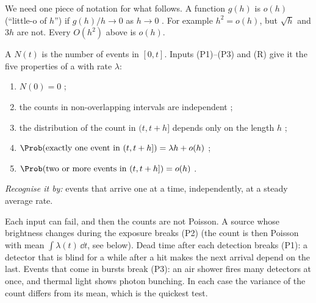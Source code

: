 We need one piece of notation for what follows. A function $g(h)$ is $o(h)$
(``little-o of $h$'') if $g(h)/h\to0$ as $h\to0$ . For example $h^2=o(h)$, but $\sqrt h$ and $3h$ are not. Every $O(h^2)$
above is $o(h)$.

\begin{workdef}
A  $N(t)$ is the number of events in $[0,t]$. Inputs
(P1)--(P3) and (R) give it the five properties of a  with rate $\lambda$:
\begin{enumerate}[label=(\roman*),leftmargin=2em,itemsep=1pt]
  \item $N(0)=0$ ;
  \item the counts in non-overlapping intervals are independent ;
  \item the distribution of the count in $(t,t+h]$ depends only on the length $h$ ;
  \item $\Prob(\text{exactly one event in }(t,t+h])=\lambda h+o(h)$ ;
  \item $\Prob(\text{two or more events in }(t,t+h])=o(h)$ .
\end{enumerate}
\emph{Recognise it by:} events that arrive one at a time, independently, at a steady average rate.
\end{workdef}

\begin{pitfall}
Each input can fail, and then the counts are not Poisson. A source whose
brightness changes during the exposure breaks (P2) (the count is then Poisson with
mean $\int\lambda(t)\,\dd t$, see below). Dead time after each detection breaks
(P1): a detector that is blind for a while after a hit makes the next arrival
depend on the last. Events that come in bursts break (P3): an air shower fires
many detectors at once, and thermal light shows photon bunching. In each case the
variance of the count differs from its mean, which is the quickest test.
\end{pitfall}

